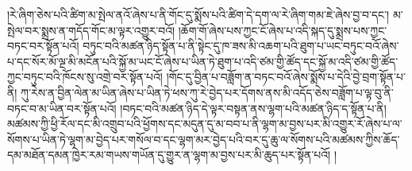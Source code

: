 །རེ་ཞིག་ཅེས་པའི་ཚིག་མ་སྤེལ་ནའོ་ཞེས་པ་ནི་གོང་དུ་སྨོས་པའི་ཚིག་དེ་དག་ལ་རེ་ཞིག་གམ་ཇེ་ཞེས་བྱ་བ་དང་། མ་སྤེལ་བར་སྨྲས་ན་གདོད་གོང་མ་ལྟར་འགྱུར་བའོ། །ཆོག་གོ་ཞེས་པས་ཀྱང་ངོ་ཞེས་པ་འདི་སྐད་དུ་སྨྲས་པས་ཀྱང་བཏང་བར་སྟོན་པའོ། བཏུང་བའི་མཚན་ཉིད་སྟོན་པ་ནི་སྟེང་དུ་ཁ་ཟས་མི་འཆག་པའི་ཐུག་པ་ཡང་བཏུང་བའོ་ཞེས་པ་དང་སོར་མོ་ལྔ་མི་མངོན་པའི་སྐྱོ་མ་ཡང་ངོ་ཞེས་པ་ཡིན་ཏེ་ཐུག་པ་འདི་ཙམ་གྱི་ཚོད་དང་སྐྱོ་མ་འདི་ཙམ་གྱི་ཚོད་ཀྱང་བཏུང་བའི་ཁོངས་སུ་འགྲེ་བར་སྟོན་པའོ། །གོང་དུ་བྱིན་པ་བཟློག་ན་བཏང་བའོ་ཞེས་སྨོས་པ་དེའི་བྱེ་བྲག་སྟོན་པ་ནི། ཀུ་རེས་ན་བྱིན་ལེན་མ་ཡིན་ཞེས་པ་ཡིན་ཏེ་ཕས་ཀུ་རེ་བྱེད་པར་དོགས་ནས་མི་འདོད་ཅེས་བཟློག་པ་ལྟ་བུ་ནི་བཏང་བ་མ་ཡིན་བར་སྟོན་པའོ། །བཏང་བའི་མཚན་ཉིད་དེ་ལྟར་བསྟན་ནས་ལྷག་པའི་མཚན་ཉིད་ད་སྟོན་པ་ནི། མཚམས་ཀྱི་ཕྱི་རོལ་དང་མི་འགྲུབ་པའི་ཕྱོགས་དང་མདུན་དུ་མ་བབ་པ་ནི་ལྷག་མ་བྱས་པར་མི་འགྱུར་རོ་ཞེས་པ་ལ་སོགས་པ་ཡིན་ཏེ་ལྷག་མ་བྱེད་པར་གསོལ་བ་དང་ལྷག་མར་བྱེད་པའི་བར་དུ་ཆུ་ལ་སོགས་པའི་མཚམས་ཀྱིས་ཆོད་དམ་མཐོན་དམན་ཁྱེར་རམ་གཡས་གཡོན་དུ་གྱུར་ན་ལྷག་མ་བྱས་པར་མི་ཆུད་པར་སྟོན་པའོ། །
